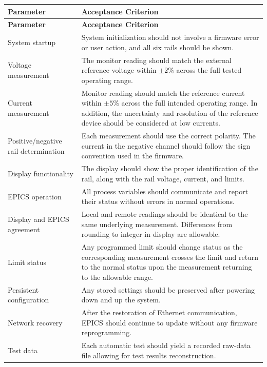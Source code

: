 \begin{longtable}{p{} p{}}
    \toprule
    \textbf{Parameter} & \textbf{Acceptance Criterion} \\
    \midrule
    \endfirsthead

    \toprule
    \textbf{Parameter} & \textbf{Acceptance Criterion} \\
    \midrule
    \endhead

    System startup &
    System initialization should not involve a firmware error or user action,
    and all six rails should be shown. \\

    Voltage measurement &
    The monitor reading should match the external reference voltage within
    \(\pm 2\%\) across the full tested operating range. \\

    Current measurement &
    Monitor reading should match the reference current within \(\pm 5\%\)
    across the full intended operating range. In addition, the uncertainty and
    resolution of the reference device should be considered at low currents. \\

    Positive/negative rail determination &
    Each measurement should use the correct polarity. The current in the negative
    channel should follow the sign convention used in the firmware. \\

    Display functionality &
    The display should show the proper identification of the rail, along with
    the rail voltage, current, and limits. \\

    EPICS operation &
    All process variables should communicate and report their status
    without errors in normal operations. \\

    Display and EPICS agreement &
    Local and remote readings should be identical to the same underlying
    measurement. Differences from rounding to integer in display are allowable. \\

    Limit status &
    Any programmed limit should change status as the corresponding measurement
    crosses the limit and return to the normal status upon the measurement
    returning to the allowable range. \\

    Persistent configuration &
    Any stored settings should be preserved after powering down and up the
    system. \\

    Network recovery &
    After the restoration of Ethernet communication, EPICS should continue to
    update without any firmware reprogramming. \\

    Test data &
    Each automatic test should yield a recorded raw-data file allowing for
    test results reconstruction. \\

    \bottomrule
\end{longtable}

